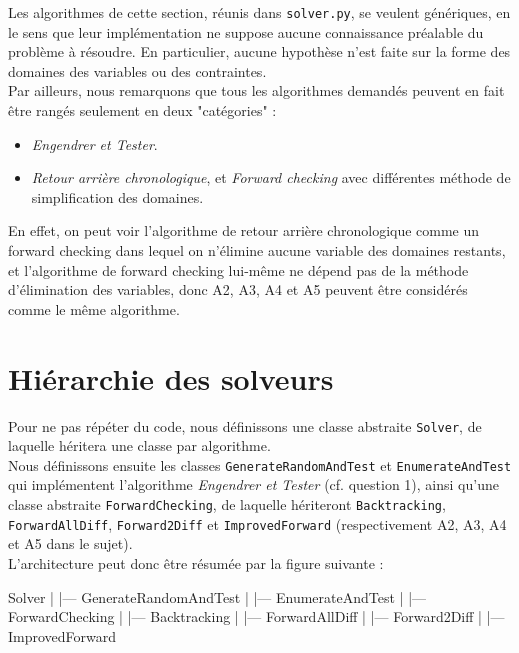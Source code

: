 \documentclass[a4paper, 12pt]{report}
\newcommand{\py}[1]{\texttt{#1}}
\begin{document}
Les algorithmes de cette section, réunis dans \py{solver.py}, se veulent génériques, en le sens que leur implémentation ne suppose aucune connaissance préalable du problème à résoudre. En particulier, aucune hypothèse n'est faite sur la forme des domaines des variables ou des contraintes. \\

Par ailleurs, nous remarquons que tous les algorithmes demandés peuvent en fait être rangés seulement en deux "catégories" :

\begin{itemize}
	\item \textit{Engendrer et Tester}.
	
	\item \textit{Retour arrière chronologique}, et \textit{Forward checking} avec différentes méthode de simplification des domaines.
\end{itemize}

En effet, on peut voir l'algorithme de retour arrière chronologique comme un forward checking dans lequel on n'élimine aucune variable des domaines restants, et l'algorithme de forward checking lui-même ne dépend pas de la méthode d'élimination des variables, donc A2, A3, A4 et A5 peuvent être considérés comme le même algorithme. \\

\section*{Hiérarchie des solveurs}

Pour ne pas répéter du code, nous définissons une classe abstraite \py{Solver}, de laquelle héritera une classe par algorithme. \\

Nous définissons ensuite les classes \py{GenerateRandomAndTest} et \py{EnumerateAndTest} qui implémentent l'algorithme \textit{Engendrer et Tester} (cf. question 1), ainsi qu'une classe abstraite \py{ForwardChecking}, de laquelle hériteront \py{Backtracking}, \py{ForwardAllDiff}, \py{Forward2Diff} et \py{ImprovedForward} (respectivement A2, A3, A4 et A5 dans le sujet). \\

L'architecture peut donc être résumée par la figure suivante :

\begin{pyblock}
Solver
|
|--- GenerateRandomAndTest
|
|--- EnumerateAndTest
|
|--- ForwardChecking
	 |
	 |--- Backtracking
	 |
	 |--- ForwardAllDiff
	 |
	 |--- Forward2Diff
	 |
	 |--- ImprovedForward
\end{pyblock}
\end{document}
